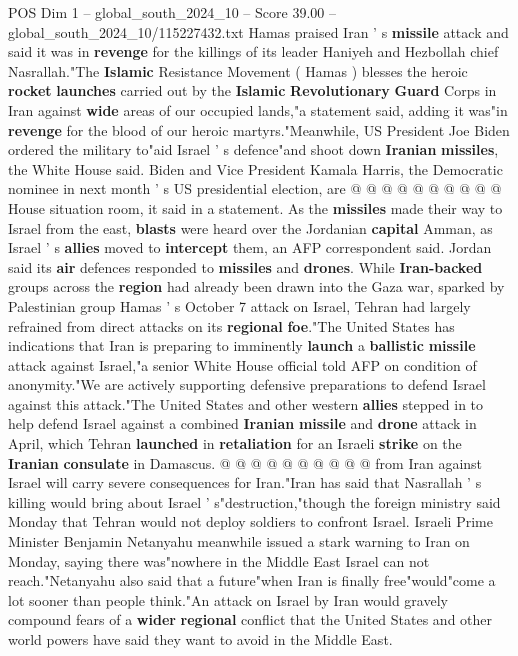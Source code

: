 \begin{textsample}{POS Dim 1 – global\_south\_2024\_10 – Score 39.00 – global\_south\_2024\_10/115227432.txt}
Hamas praised Iran ' s \textbf{missile} attack and said it was in \textbf{revenge} for the killings of its leader Haniyeh and Hezbollah chief Nasrallah."The \textbf{Islamic} Resistance Movement ( Hamas ) blesses the heroic \textbf{rocket} \textbf{launches} carried out by the \textbf{Islamic} \textbf{Revolutionary} \textbf{Guard} Corps in Iran against \textbf{wide} areas of our occupied lands,"a statement said, adding it was"in \textbf{revenge} for the blood of our heroic martyrs."Meanwhile, US President Joe Biden ordered the military to"aid Israel ' s defence"and shoot down \textbf{Iranian} \textbf{missiles}, the White House said.
Biden and Vice President Kamala Harris, the Democratic nominee in next month ' s US presidential election, are @ @ @ @ @ @ @ @ @ @ House situation room, it said in a statement.
As the \textbf{missiles} made their way to Israel from the east, \textbf{blasts} were heard over the Jordanian \textbf{capital} Amman, as Israel ' s \textbf{allies} moved to \textbf{intercept} them, an AFP correspondent said.
Jordan said its \textbf{air} defences responded to \textbf{missiles} and \textbf{drones}.
While \textbf{Iran-backed} groups across the \textbf{region} had already been drawn into the Gaza war, sparked by Palestinian group Hamas ' s October 7 attack on Israel, Tehran had largely refrained from direct attacks on its \textbf{regional} \textbf{foe}."The United States has indications that Iran is preparing to imminently \textbf{launch} a \textbf{ballistic} \textbf{missile} attack against Israel,"a senior White House official told AFP on condition of anonymity."We are actively supporting defensive preparations to defend Israel against this attack."The United States and other western \textbf{allies} stepped in to help defend Israel against a combined \textbf{Iranian} \textbf{missile} and \textbf{drone} attack in April, which Tehran \textbf{launched} in \textbf{retaliation} for an Israeli \textbf{strike} on the \textbf{Iranian} \textbf{consulate} in Damascus. @ @ @ @ @ @ @ @ @ @ from Iran against Israel will carry severe consequences for Iran."Iran has said that Nasrallah ' s killing would bring about Israel ' s"destruction,"though the foreign ministry said Monday that Tehran would not deploy soldiers to confront Israel.
Israeli Prime Minister Benjamin Netanyahu meanwhile issued a stark warning to Iran on Monday, saying there was"nowhere in the Middle East Israel can not reach."Netanyahu also said that a future"when Iran is finally free"would"come a lot sooner than people think."An attack on Israel by Iran would gravely compound fears of a \textbf{wider} \textbf{regional} conflict that the United States and other world powers have said they want to avoid in the Middle East.

\end{textsample}

